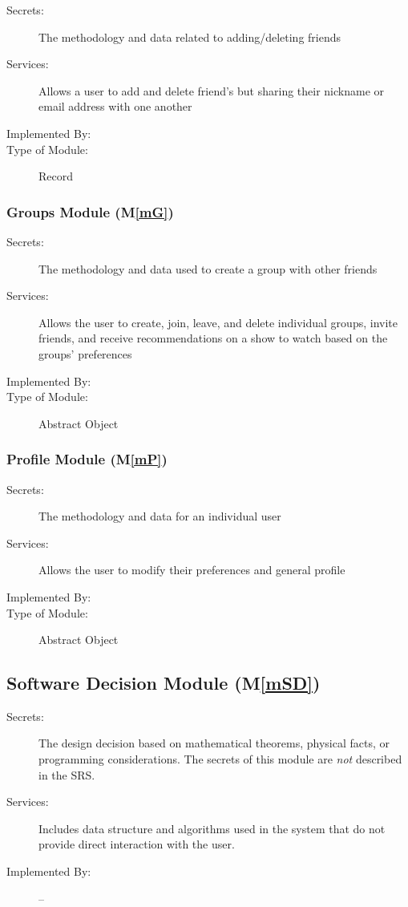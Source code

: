 \documentclass[12pt, titlepage]{article}
\newcommand{\mref}[1]{M\ref{#1}}
\begin{document}
\begin{description}
\item[Secrets:] The methodology and data related to adding/deleting friends
\item[Services:] Allows a user to add and delete friend's but sharing their nickname or email address with one another
\item[Implemented By:] \progname
\item[Type of Module:] Record
\end{description}

\subsubsection{Groups Module (\mref{mG})}

\begin{description}
\item[Secrets:] The methodology and data used to create a group with other friends
\item[Services:] Allows the user to create, join, leave, and delete individual groups, invite friends, and receive recommendations on a show to watch based on the groups' preferences
\item[Implemented By:] \progname
\item[Type of Module:] Abstract Object
\end{description}

\subsubsection{Profile Module (\mref{mP})}

\begin{description}
\item[Secrets:] The methodology and data for an individual user
\item[Services:] Allows the user to modify their preferences and general profile
\item[Implemented By:] \progname
\item[Type of Module:] Abstract Object
\end{description}

\subsection{Software Decision Module (\mref{mSD})}

\begin{description}
\item[Secrets:] The design decision based on mathematical theorems, physical
  facts, or programming considerations. The secrets of this module are
  \emph{not} described in the SRS.
\item[Services:] Includes data structure and algorithms used in the system that
  do not provide direct interaction with the user. 
\item[Implemented By:] --
\end{description}
\end{document}
